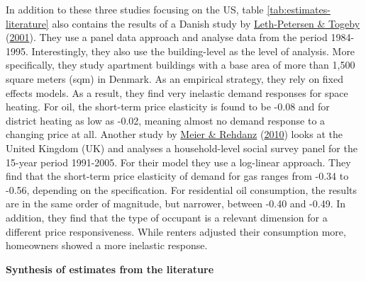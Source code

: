 \documentclass[12pt,twoside]{reedthesis}
\begin{document}
In addition to these three studies focusing on the US, table \ref{tab:estimates-literature} also contains the results of a Danish study by \protect\hyperlink{ref-leth-petersen_togeby01}{Leth-Petersen \& Togeby} (\protect\hyperlink{ref-leth-petersen_togeby01}{2001}). They use a panel data approach and analyse data from the period 1984-1995. Interestingly, they also use the building-level as the level of analysis. More specifically, they study apartment buildings with a base area of more than 1,500 square meters (sqm) in Denmark. As an empirical strategy, they rely on fixed effects models. As a result, they find very inelastic demand responses for space heating. For oil, the short-term price elasticity is found to be -0.08 and for district heating as low as -0.02, meaning almost no demand response to a changing price at all. Another study by \protect\hyperlink{ref-meier_rehdanz10}{Meier \& Rehdanz} (\protect\hyperlink{ref-meier_rehdanz10}{2010}) looks at the United Kingdom (UK) and analyses a household-level social survey panel for the 15-year period 1991-2005. For their model they use a log-linear approach. They find that the short-term price elasticity of demand for gas ranges from -0.34 to -0.56, depending on the specification. For residential oil consumption, the results are in the same order of magnitude, but narrower, between -0.40 and -0.49. In addition, they find that the type of occupant is a relevant dimension for a different price responsiveness. While renters adjusted their consumption more, homeowners showed a more inelastic response.

\textbf{Synthesis of estimates from the literature}
\end{document}
